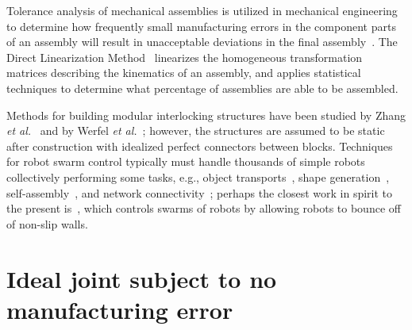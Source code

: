 \documentclass[11pt, twocolumn]{article}
\begin{document}
Tolerance analysis of mechanical assemblies is utilized in mechanical engineering to determine how frequently small manufacturing errors in the component parts of an assembly will result in unacceptable deviations in the final assembly~\cite{Chase1991-survey-of-tolerance-analysis}. The Direct Linearization Method~\cite{Chase1996-geometric-tolerance-analysis} linearizes the homogeneous transformation matrices describing the kinematics of an assembly, and applies statistical techniques to determine what percentage of assemblies are able to be assembled.





Methods for building modular interlocking structures have been studied by Zhang {\em et al.}~\cite{Zhang2018-interlocking,Zhang2016a} and by Werfel {\em et al.}~\cite{Werfel2006-mobile-robot-construction}; however, the structures are assumed to be static after construction with idealized perfect connectors between blocks. Techniques for robot swarm control typically must handle thousands of simple robots collectively performing some tasks, e.g., object transports~\cite{alonso2017multi}, shape generation~\cite{hsieh2008decentralized}, self-assembly~\cite{o2014self,rubenstein2014programmable}, and network connectivity~\cite{esposito2006maintaining}; perhaps the closest work in spirit to the present is~\cite{ShahrokhiMB17}, which controls swarms of robots by allowing robots to bounce off of non-slip walls.



\section{Ideal joint subject to no manufacturing error}
\label{sec:perfect}
\end{document}
